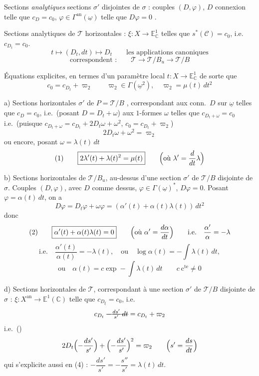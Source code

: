 \documentclass[11pt,a4paper]{article}
\begin{document}
Sections \emph{analytiques}  sections $\sigma'$ disjointes de $\sigma$ : couples \struck{\ill{}} $(D,\varphi)$, $D$ connexion  telle que $c_D=c_0$, $\varphi\in\Gamma^{\mathrm{an}}(\underline{\omega})$ telle que $D\varphi=0$ .

Sections analytiques de $\mathcal{T}$ horizontales :   $\xi:X\to\mathbb{E}^1_{\mathbb{C}}$ telles que $s^*(\mathcal{C})=c_0$, i.e.\ $c_{D_t}=c_0$.
\[
t\longmapsto(D_t,dt)\longmapsto D_t\qquad\text{les applications canoniques}
\]
\[
\text{correspondent :}\qquad \mathcal{T}\to\mathcal{T}/B_u\to\mathcal{T}/B
\]

Équations explicites, en termes d'un paramètre local $t:X\to\mathbb{E}^1_{\mathbb{C}}$ de sorte que
\[
c_0=c_{D_t}+\varpi_2\qquad\varpi_2\in\Gamma(\underline{\omega}^2),\quad\varpi_2=\mu(t)\,dt^2
\]

a) Sections horizontales $\sigma'$ de $P=\mathcal{T}/B$ , correspondant aux conn.\ $D$ sur $\underline{\omega}$ telles que $c_D=c_0$, i.e.\ (posant $D=D_t+\omega$) aux $1$-formes $\omega$ telles que $c_{D_t+\omega}=c_0$ i.e.\ (puisque $c_{D_t+\omega}=c_{D_t}+2D_t\omega+\omega^2$, $c_0=c_{D_t}+\varpi_2$)
\[
2D_t\omega+\omega^2=\varpi_2
\]
ou encore, posant $\omega=\lambda(t)\,dt$
\[
(1)\qquad\boxed{2\lambda'(t)+\lambda(t)^2=\mu(t)}\qquad\Bigl(\text{où }\lambda'=\frac{d}{dt}\lambda\Bigr)
\]

b) Sections horizontales de $\mathcal{T}/B_u$, au-dessus d'une section $\sigma'$ de $\mathcal{T}/B$ disjointe de $\sigma$. Couples $(D,\varphi)$, avec $D$ comme dessus, $\varphi\in\Gamma(\underline{\omega})^*$, $D\varphi=0$. Posant $\varphi=\alpha(t)\,dt$, on a
\[
D\varphi=D_t\varphi+\omega\varphi=(\alpha'(t)+\alpha(t)\lambda(t))\,dt^2
\]
donc
\[
(2)\qquad\boxed{\alpha'(t)+\alpha(t)\lambda(t)=0}\qquad\Bigl(\text{où }\alpha'=\frac{d\alpha}{dt}\Bigr)\qquad\text{i.e.}\quad\frac{\alpha'}{\alpha}=-\lambda
\]
\[
\text{i.e.}\quad\frac{\alpha'(t)}{\alpha(t)}=-\lambda(t),\quad\text{ou}\quad\log\alpha(t)=-\int\lambda(t)\,dt,
\]
\[
\text{ou}\quad\alpha(t)=c\exp-\int\lambda(t)\,dt\qquad c\ \mathrm{c}^{\mathrm{te}}\neq0
\]

d) Sections horizontales de $\mathcal{T}$, \struck{\ill{}} correspondant à une section $\sigma'$ de $\mathcal{T}/B$ disjointe de $\sigma$ : $\xi:X^{\mathrm{an}}\to\mathbb{E}^1(\mathbb{C})$ telle que $c_{D_\xi}=c_0$, i.e.
\[
c_{D_t}\;\text{\struck{$-\frac{ds'}{s'}\,dt$}}=c_{D_t}+\varpi_2
\]
i.e.\ ()
\[
2D_t\Bigl(-\frac{ds'}{s'}\Bigr)+\Bigl(-\frac{ds'}{s'}\Bigr)^2=\varpi_2\qquad\Bigl(s'=\frac{ds}{dt}\Bigr)
\]
qui s'explicite aussi en (4) : $-\dfrac{ds'}{s'}=-\dfrac{s''}{s'}=\lambda(t)\,dt$.
\end{document}
